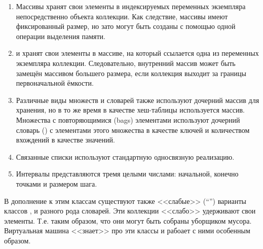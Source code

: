 \documentclass[a4paper,10pt,twoside]{book}
\begin{document}
\begin{enumerate}
  \item Массивы хранят свои элементы в индексируемых переменных экземпляра непосредственно объекта коллекции. Как следствие, массивы имеют фиксированный размер, но зато могут быть созданы с помощью одной операции выделения памяти.
  \item {} и  хранят свои элементы в массиве, на который ссылается одна из переменных экземпляра коллекции.
Следовательно, внутренний массив может быть замещён массивом большего размера, если коллекция выходит за границы первоначальной ёмкости.
  \item Различные виды множеств и словарей также используют дочерний массив для хранения, но в то же время в качестве хеш-таблицы используется массив. Множества с повторяющимися (bags) элементами используют дочерний словарь () с элементами этого множества в качестве ключей и количеством вхождений в качестве значений.
  \item Связанные списки используют стандартную односвязную реализацию.
  \item Интервалы представляются тремя целыми числами: начальной, конечно точками и размером шага.
\end{enumerate}
В дополнение к этим классам существуют также <<слабые>> (``'') варианты классов ,  и разного рода словарей. Эти коллекции <<слабо>> удерживают свои элементы. Т.е. таким образом, что они могут быть собраны уборщиком мусора.
Виртуальная машина \pharo <<знает>> про эти классы и рабоает с ними особенным образом.
\end{document}
